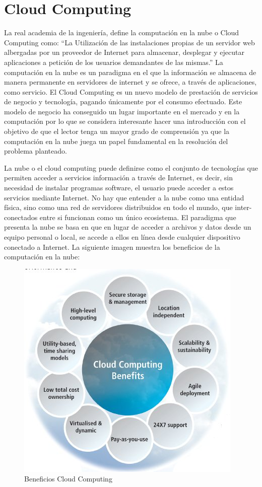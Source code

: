 \documentclass[a4paper,11pt]{book}
\begin{document}
\section{Cloud Computing}

La real academia de la ingeniería, define la computación en la nube o Cloud Computing\citep{realacademia}  como: “La Utilización de las instalaciones propias de un servidor web albergadas por un proveedor de Internet\cite{latexcompanion} para almacenar, desplegar y ejecutar aplicaciones a petición de los usuarios demandantes de las mismas.” La computación en la nube es un paradigma en el que la información se almacena de manera permanente en servidores de internet y se ofrece, a través de aplicaciones, como servicio. El Cloud Computing es un nuevo modelo de prestación de servicios\cite{magazine} de negocio y tecnología, pagando únicamente por el consumo efectuado. Este modelo de negocio ha conseguido un lugar importante en el mercado y en la computación  por lo que se considera  interesante hacer una introducción con el objetivo de que el lector tenga un mayor grado de comprensión ya que la computación en la nube juega un papel fundamental en la resolución  del problema planteado.

La nube  o el cloud computing  puede definirse  como el conjunto de tecnologías que permiten acceder a servicios información a través de Internet, es decir, sin necesidad de instalar programas software, el usuario puede acceder a estos servicios mediante Internet. No hay que entender a la nube como una entidad física, sino como una red de servidores distribuidos en todo el mundo, que inter-conectados entre si funcionan como un único ecosistema.  El paradigma que presenta la nube se basa en que en lugar de acceder a archivos y datos desde un equipo personal o local, se accede a ellos en línea desde cualquier dispositivo conectado a Internet. La siguiente imagen muestra los beneficios de la computación en la nube:

\begin{figure}[H]
\centering
\includegraphics[scale=0.5]{imagenes/beneficiosCC.jpg}
\caption{ Beneficios Cloud Computing\cite{beneficios} }
\end{figure}
\end{document}
